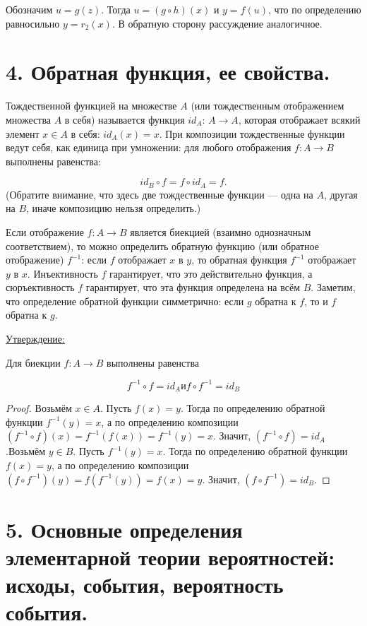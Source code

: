 \documentclass[a4paper, 12pt]{article}
\newcommand{\statement}{\underline{Утверждение:} }
\begin{document}
Обозначим $u = g(z)$. Тогда $u = (g \circ h)(x)$ и $y = f(u)$, что по определению равносильно $y = r_2(x)$.
В обратную сторону рассуждение аналогичное.

\section*{4. Обратная функция, ее свойства.}
Тождественной функцией на множестве $A$ (или тождественным отображением множества $A$ в себя) называется функция $id_A$: $A \to A$, которая отображает всякий элемент $x \in A$ в себя: $id_A(x) = x$. При композиции тождественные функции ведут
себя, как единица при умножении: для любого отображения $f : A\to B$ выполнены равенства:

\[
    id_B \circ f = f \circ id_A = f.
\]
(Обратите внимание, что здесь две тождественные функции — одна на $A$, другая на $B$, иначе композицию нельзя определить.)

Если отображение $f : A \to B$ является биекцией (взаимно однозначным соответствием), то можно определить обратную функцию (или обратное отображение) $f^{-1}$:
если $f$ отображает $x$ в $y$, то обратная функция $f^{-1}$ отображает $y$ в $x$. Инъективность $f$ гарантирует, что это действительно функция, а сюръективность $f$ гарантирует,
что эта функция определена на всём $B$.
Заметим, что определение обратной функции симметрично: если $g$ обратна к $f$, то и $f$ обратна к $g$.

\statement{Для биекции $f : A \to B$ выполнены равенства

\[
    f^{-1} \circ f = id_A \text{и} f \circ f^{-1} = id_B
\]
}

\begin{proof}
Возьмём $x \in A$. Пусть $f(x) = y$. Тогда по определению обратной
функции $f^{-1}(y) = x$, а по определению композиции $(f^{-1} \circ f)(x) = f^{-1}(f(x)) = f^{-1}(y) = x$. Значит, $(f^{-1} \circ f) = id_A$.Возьмём $y \in B$. Пусть $f^{-1}(y) = x$. Тогда по определению обратной функции $f(x) = y$, а по определению композиции $(f \circ f^{-1})(y) = f(f^{-1}(y)) = f(x) = y$. Значит, $(f \circ f^{-1}) = id_B$.

\end{proof}

\section*{5. Основные определения элементарной теории вероятностей: исходы, события, вероятность события.}
\end{document}
